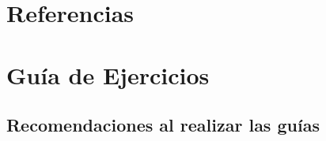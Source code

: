 \documentclass[
  letterpaper,
  DIV=11,
  numbers=noendperiod]{scrreprt}
\newlength{\cslhangindent}
\newlength{\cslentryspacingunit} %
\newenvironment{CSLReferences}[2] %
 {%
  \setlength{\parindent}{0pt}
  \ifodd #1
  \let\oldpar\par
  \def\par{\hangindent=\cslhangindent\oldpar}
  \fi
  \setlength{\parskip}{#2\cslentryspacingunit}
 }%
 {}
\begin{document}

\hypertarget{referencias}{%
\chapter*{Referencias}\label{referencias}}


\hypertarget{refs}{}
\begin{CSLReferences}{0}{0}
\end{CSLReferences}


\hypertarget{guuxeda-de-ejercicios}{%
\chapter*{Guía de Ejercicios}\label{guuxeda-de-ejercicios}}


\hypertarget{recomendaciones-al-realizar-las-guuxedas}{%
\section*{Recomendaciones al realizar las
guías}\label{recomendaciones-al-realizar-las-guuxedas}}

\end{document}
